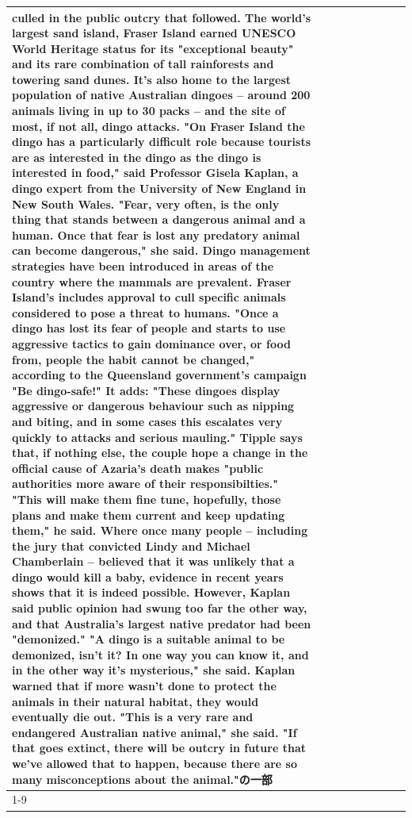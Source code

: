 \begin{table}[H]
\begin{tabular}{lllrlllll}
culled in the public outcry that followed. The world's largest sand island, Fraser Island earned UNESCO World Heritage status for its "exceptional beauty" and its rare combination of tall rainforests and towering sand dunes. It's also home to the largest population of native Australian dingoes -- around 200 animals living in up to 30 packs -- and the site of most, if not all, dingo attacks. "On Fraser Island the dingo has a particularly difficult role because tourists are as interested in the dingo as the dingo is interested in food," said Professor Gisela Kaplan, a dingo expert from the University of New England in New South Wales. "Fear, very often, is the only thing that stands between a dangerous animal and a human. Once that fear is lost any predatory animal can become dangerous," she said. Dingo management strategies have been introduced in areas of the country where the mammals are prevalent. Fraser Island's includes approval to cull specific animals considered to pose a threat to humans. "Once a dingo has lost its fear of people and starts to use aggressive tactics to gain dominance over, or food from, people the habit cannot be changed," according to the Queensland government's campaign "Be dingo-safe!" It adds: "These dingoes display aggressive or dangerous behaviour such as nipping and biting, and in some cases this escalates very quickly to attacks and serious mauling." Tipple says that, if nothing else, the couple hope a change in the official cause of Azaria's death makes "public authorities more aware of their responsibilties." "This will make them fine tune, hopefully, those plans and make them current and keep updating them," he said. Where once many people -- including the jury that convicted Lindy and Michael Chamberlain -- believed that it was unlikely that a dingo would kill a baby, evidence in recent years shows that it is indeed possible. However, Kaplan said public opinion had swung too far the other way, and that Australia's largest native predator had been "demonized." "A dingo is a suitable animal to be demonized, isn't it? In one way you can know it, and in the other way it's mysterious," she said. Kaplan warned that if more wasn't done to protect the animals in their natural habitat, they would eventually die out. "This is a very rare and endangered Australian native animal," she said. "If that goes extinct, there will be outcry in future that we've allowed that to happen, because there are so many misconceptions about the animal."の一部 \\
\cline{1-9}

\end{tabular}
\end{table}
